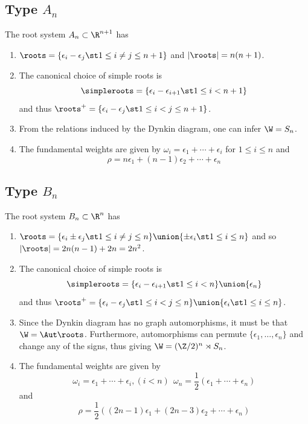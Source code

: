 \documentclass[11pt,leqno,oneside]{amsart}
\numberwithin{thm}{section}
\newcommand{\halfsum}{\rho}
\renewcommand{\Sym}{S}
\begin{document}
\subsection{Type \(A_n\)}
\begin{prop}
The root system \(A_n \subset \R^{n+1}\) has
\begin{enumerate}
\item \(\roots = \{\epsilon_i - \epsilon_j \st 1 \leq i \neq j \leq
  n+1\}\) and \(|\roots| = n(n+1)\).
\item The canonical choice of simple roots is \[
    \simpleroots = \{\epsilon_i - \epsilon_{i+1} \st 1 \leq i < n+1\}
  \]
  and thus \(\roots^+ = \{\epsilon_i-\epsilon_j \st 1 \leq i < j \leq
  n+1\}\).
\item From the relations induced by the Dynkin diagram, one can infer
  \(\W = \Sym_n\). 
\item The fundamental weights are given by \(\omega_i =
  \epsilon_1+\cdots+\epsilon_i\) for \(1 \leq i \leq n\) and \[
    \halfsum = n \epsilon_1 + (n-1) \epsilon_2 + \cdots + \epsilon_n
  \]
\end{enumerate}
\end{prop}
\subsection{Type \(B_n\)}
\begin{prop}
  The root system \(B_n \subset \R^n\) has
  \begin{enumerate}
  \item \(\roots = \{\epsilon_i \pm \epsilon_j \st 1 \leq i \neq j
    \leq n\} \union \{\pm \epsilon_i \st 1 \leq i \leq n\}\) and so
    \(|\roots| = 2n(n-1)+2n = 2n^2\).
  \item The canonical choice of simple roots is \[
      \simpleroots = \{\epsilon_i - \epsilon_{i+1} \st 1 \leq  i < n\}
      \union \{\epsilon_n\}
    \]
    and thus \(\roots^+ = \{\epsilon_i-\epsilon_j \st 1 \leq i < j
    \leq n\} \union \{\epsilon_i \st 1 \leq i \leq n\}\).
  \item Since the Dynkin diagram has no graph automorphisms, it must
    be that \(\W = \Aut \roots\). Furthermore, automorphisms can
    permute \(\{\epsilon_1, \ldots, \epsilon_n\}\) and change any of
    the signs, thus giving \(\W = (\Z/2)^n \rtimes \Sym_n\).
  \item The fundamental weights are given by \[
      \omega_i = \epsilon_1 + \cdots + \epsilon_i, (i < n) \ \ \omega_n
      = \frac{1}{2}(\epsilon_1 + \cdots + \epsilon_n)
    \]
    and \[
      \halfsum = \frac{1}{2}((2n-1)\epsilon_1 + (2n-3)\epsilon_2 +
      \cdots + \epsilon_n)
    \]
  \end{enumerate}
\end{prop}
\end{document}
